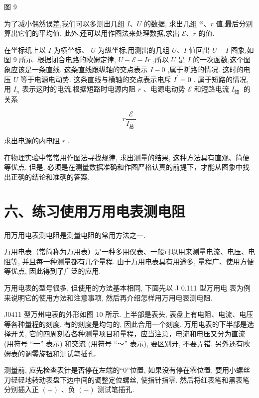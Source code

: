\documentclass[10pt]{article}
\begin{document}
图 9

为了减小偶然误差,我们可以多测出几组 \(I\text{、}U\) 的数据, 求出几组 \({}^{ \otimes }\text{、}r\) 值,最后分别算出它们的平均值. 此外,还可以用作图法来处理数据,求出 \(\mathcal{E}\text{、}r\) 的值.

在坐标纸上以 \(I\) 为横坐标、 \(U\) 为纵坐标,用测出的几组 \(U\text{、}I\) 值回出 \(U - I\) 图象,如图 9 所示. 根据闭合电路的欧姆定律, \(U - \mathcal{E} - {Ir}\) ,所以 \(U\) 是 \(I\) 的一次函数,这个图象应该是一条直线. 这条直线跟纵轴的交点表示 \(I - 0\) ,属于断路的情况. 这时的电压 \(U\) 等于电源电动势. 这条直线与横轴的交点表示电斥 \({I}^{\prime } = 0\) . 属于短路的情况,用 \({I}_{n}\) 表示这时的电流,根据短路时电源内阻 \(r\) 、电源电动势 \(\mathcal{E}\) 和短路电流 \({I}_{\text{知 }}\) 的关系

\[
r\frac{\mathcal{E}}{{I}_{\text{总 }}}
\]

求出电源的内电阻 \(r\) .

在物理实验中常常用作图法寻找规律, 求出测量的结果, 这种方法具有直观、简便等优点. 但是, 必须是在测量数据准确和作图严格认真的前提下，才能从图象中找出正确的结论和准确的答案.

\section*{六、练习使用万用电表测电阻}

用万用电表测电阻是测量电阻的常用方法之一.

万用电表（常简称为万用表）是一种多用仪表、一般可以用来测量电流、电压、电阻等, 并且每一种测量都有几个量程. 由于万用电表具有用途多, 量程广、使用方便等优点, 因此得到了广泛的应用.

万用电表的型号很多, 但使用的方法基本相同, 下面先以 J 0.111 型万用电 表为例来说明它的使用方法和注意事项, 然后再介绍怎样用万用电表测电阻.

J0411 型万州电表的外形如图 10 所示. 上半部是表头, 表盘上有电阻、电流、电压等各种量程的刻度. 有的刻度是均匀的, 因此合用一个刻度. 万用电表的下半部是选择开关, 它的四周刻着各种测量项目和量程，应当注意，电流和电压又分为直流 (用符号 “一” 表示) 和交流 (用符号 “～” 表示), 要区别开, 不要弄错. 另外还有欧姆表的调零旋钮和测试笔插孔.

测量前, 应先检查表针是否停在左端的“0”位置, 如果没有停在零位置, 要用小螺丝刀轻轻地转动表盘下边中间的调整定位螺丝, 使指针指零. 然后将红表笔和黑表笔分别插入正 \(\left( +\right)\) 、负 \(\left( -\right)\) 测试笔插孔.
\end{document}

